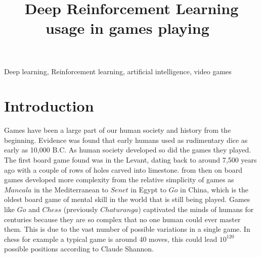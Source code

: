 \documentclass[conference]{IEEEtran}
\begin{document}
\title{Deep Reinforcement Learning usage in games playing\
}

\author{
}





\maketitle

\begin{abstract}

\end{abstract}

\begin{IEEEkeywords}
Deep learning, Reinforcement learning, artificial intelligence, video games
\end{IEEEkeywords}

\section{Introduction}
Games have been a large part of our human society and history from the beginning. Evidence was found that early humans used  as rudimentary dice as early as 10,000 B.C\cite{10.1007/978-981-10-0575-6_1       }. As human society developed so did the games they played. The first board game found was in the Levant, dating back to around 7,500 years ago \cite{simpson2007earliest} with a couple of rows of holes carved into limestone. from then on board games developed more complexity from the relative simplicity of games as $Mancala$ in the Mediterranean to $Senet$ in Egypt to $Go$ in China, which is the  oldest board game of mental skill in the world that is still being played\cite{shotwell1994game}. Games like $Go$ and $Chess$ (previously $Chaturanga$) captivated the minds of humans for centuries because they are so complex that no one human could ever master them. This is due to the vast number of possible variations in a single game. In chess for example a typical game is around 40 moves, this could lead $10^{120}$ possible positions according to Claude Shannon\cite{shannon1950xxii}.
\end{document}
